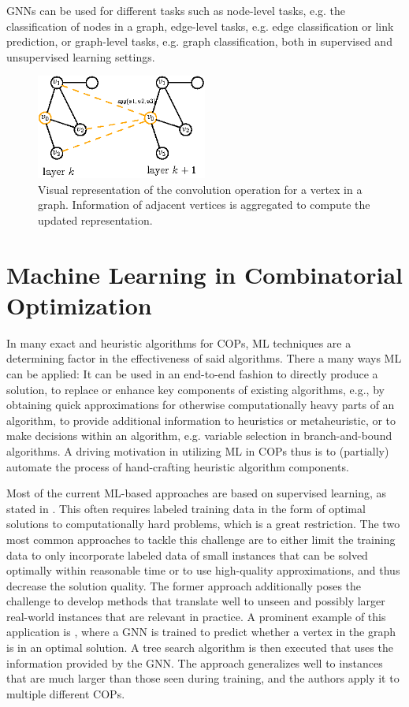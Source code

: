 \documentclass[draft,final]{vutinfth} %
\begin{document}
GNNs can be used for different tasks such as node-level tasks, e.g. the classification of nodes in a graph, edge-level tasks, e.g. edge classification or link prediction, or graph-level tasks, e.g. graph classification, both in supervised and unsupervised learning settings. 

\begin{figure}
    \centering
    \includegraphics[width=0.5\textwidth]{graphics/gnn-conv.eps}
    \caption{Visual representation of the convolution operation for a vertex in a graph. Information of adjacent vertices is aggregated to compute the updated representation.}
    \label{fig:conv-gnn}
\end{figure}

\section{Machine Learning in Combinatorial Optimization}\label{sec:ml-co}

In many exact and heuristic algorithms for COPs, ML techniques are a determining factor in the effectiveness of said algorithms. There a many ways ML can be applied: It can be used in an end-to-end fashion to directly produce a solution, to replace or enhance key components of existing algorithms, e.g., by obtaining quick approximations for otherwise computationally heavy parts of an algorithm, to provide additional information to heuristics or metaheuristic, or to make decisions within an algorithm, e.g. variable selection in branch-and-bound algorithms. A driving motivation in utilizing ML in COPs thus is to (partially) automate the process of hand-crafting heuristic algorithm components. 

Most of the current ML-based approaches are based on supervised learning, as stated in \cite{Cappart2021}. This often requires labeled training data in the form of optimal solutions to computationally hard problems, which is a great restriction. 
The two most common approaches to tackle this challenge are to either limit the training data to only incorporate labeled data of small instances that can be solved optimally within reasonable time or to use high-quality approximations, and thus decrease the solution quality. The former approach additionally poses the challenge to develop methods that translate well to unseen and possibly larger real-world instances that are relevant in practice. 
A prominent example of this application is \cite{Li2018}, where a GNN is trained to predict whether a vertex in the graph is in an optimal solution. A tree search algorithm is then executed that uses the information provided by the GNN. The approach generalizes well to instances that are much larger than those seen during training, and the authors apply it to multiple different COPs. 
\end{document}
